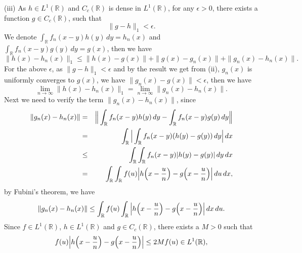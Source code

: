 \documentclass[12pt]{article}
\begin{document}
\vspace{4pt}

(iii) As $h \in L^{1}(\mathbb{R})$ and $C_{c} (\mathbb{R})$ is dense in $L^{1} (\mathbb{R})$, for any $\epsilon > 0$, there exists  a function $g \in C_{c}(\mathbb{R})$, such that
\begin{equation*}
    \|g - h\|_{1} < \epsilon.
\end{equation*}
We denote $\int_{\mathbb{R}}^{} f_{n} (x - y) h(y) \, d y = h_{n}(x)$ and $\int_{\mathbb{R}}^{} f_{n} (x - y) g(y) \, d y = g(x)$, then we have
\begin{equation*}
    \|h(x) - h_{n}(x)\|_{1} \leq \|h(x) - g(x)\| + \|g(x) - g_{n}(x)\| + \|g_{n}(x) - h_{n}(x)\|.
\end{equation*}
For the above $\epsilon$, as $\|g - h\|_{1} < \epsilon$ and by the result we get from (ii), $g_{n}(x)$ is uniformly converges to $g(x)$, we have $\|g_{n}(x) - g(x)\| < \epsilon$, then we have
\begin{equation*}
    \lim_{n \to \infty} \|h(x) - h_{n}(x)\|_{1} = \lim_{n \to \infty} \|g_{n}(x) - h_{n}(x)\|.
\end{equation*}
Next we need to verify the term $\|g_{n}(x) - h_{n}(x)\|$, since
\begin{eqnarray*}
    \|g_{n}(x) - h_{n}(x)\| & = & \Big{\|} \int_{\mathbb{R}}^{} f_{n} (x - y) h(y) \, d y - \int_{\mathbb{R}}^{} f_{n} (x - y) g(y) \, d y \Big{\|} \\
    & = & \int_{\mathbb{R}}^{} \Big{|}  \int_{\mathbb{R}}^{} f_{n} (x - y) ( h(y) - g(y)) \, d y \Big{|} \, d x \\
    & \leq & \int_{\mathbb{R}}^{} \int_{\mathbb{R}}^{} f_{n} (x - y) | h(y) - g(y)| \, d y \, d x \\
    & = & \int_{\mathbb{R}}^{} \int_{\mathbb{R}}^{} f (u) \Big{|} h \Big{(} x - \frac{u}{n} \Big{)} - g \Big{(} x - \frac{u}{n} \Big{)} \Big{|} \, d u \, d x,
\end{eqnarray*}
by Fubini's theorem, we have
\begin{equation*}
    \|g_{n}(x) - h_{n}(x)\| \leq \int_{\mathbb{R}}^{} f (u)  \int_{\mathbb{R}}^{}  \Big{|} h \Big{(} x - \frac{u}{n} \Big{)} - g \Big{(} x - \frac{u}{n} \Big{)} \Big{|} \, d x \, d u.
\end{equation*}
Since $f \in L^{1}(\mathbb{R})$, $h \in L^{1}(\mathbb{R})$ and $g \in C_{c}(\mathbb{R})$, there exists a $M > 0$ such that 
\begin{equation*}
    f (u) \Big{|} h \Big{(} x - \frac{u}{n} \Big{)} - g \Big{(} x - \frac{u}{n} \Big{)} \Big{|} \leq 2 M f(u) \in L^{1}(\mathbb{R}),
\end{equation*}
\end{document}
